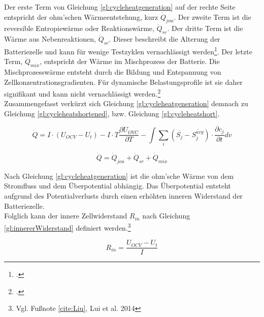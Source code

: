 Der erste Term von Gleichung \ref{gl:cycleheatgeneration} auf der rechte Seite entspricht der ohm'schen Wärmeentstehung, kurz $\dot{Q}_{jou}$. Der zweite Term ist die reversible Entropiewärme oder Reaktionswärme, $\dot{Q}_{re}$. Der dritte Term ist die Wärme aus Nebenreaktionen, $\dot{Q}_{sr}$. Dieser beschreibt die Alterung der Batteriezelle und kann für wenige Testzyklen vernachlässigt werden\footcite[Vgl.][]{Forgez2010}. Der letzte Term, $\dot{Q}_{mix}$, entspricht der Wärme im Mischprozess der Batterie. Die Mischprozesswärme entsteht durch die Bildung und Entspannung von Zellkonzentrationsgradienten. Für dynamische Belastungsprofile ist sie daher signifikant und kann nicht vernachlässigt werden.\footcite[Vgl.][]{Thomas2003} \\
Zusammengefasst verkürzt sich Gleichung \ref{gl:cycleheatgeneration} demnach zu Gleichung \ref{gl:cycleheatshortened}, bzw. Gleichung \ref{gl:cycleheatshort}.

\begin{equation}\label{gl:cycleheatshortened}
	\dot{Q} = I \cdot (U_{OCV} - U_{t})
	- I \cdot T \frac{\partial U_{OVC}}{\partial T}
	- \int \sum_{i}^{ } (\overline{S_{j}} - \overline{S_{j}^{avg}})	\cdot \frac{\partial c_{j}}{\partial t} dv
\end{equation}

\begin{equation}\label{gl:cycleheatshort}
	\dot{Q} = \dot{Q}_{jou} + \dot{Q}_{sr} + \dot{Q}_{mix}
\end{equation}

Nach Gleichung \ref{gl:cycleheatgeneration} ist die ohm'sche Wärme von dem Stromfluss und dem Überpotential abhängig. Das Überpotential entsteht aufgrund des Potentialverlusts durch einen erhöhten inneren Widerstand der Batteriezelle.\\
Folglich kann der innere Zellwiderstand $R_{in}$ nach Gleichung \ref{gl:innererWiderstand} definiert werden.\footnote{Vgl. Fußnote \ref{cite:Liu}, Lui et al. 2014}

\begin{equation}\label{gl:innererWiderstand}
	R_{in} = \frac{U_{OCV} - U_{t}}{I}
\end{equation}

